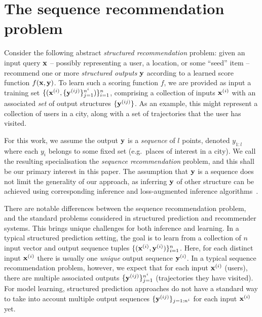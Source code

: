 \section{The sequence recommendation problem}
\label{sec:recseq}

Consider the following abstract
\emph{structured recommendation} problem:
given an input query $\mathbf{x}$ -- possibly representing a user, a location, or some ``seed'' item --
recommend one or more \emph{structured outputs} $\mathbf{y}$ according to a learned score function $f(\mathbf{x},\mathbf{y})$. 
To learn such a scoring function $f$,
we are provided as input a training set
$\{ ( \mathbf{x}^{({i})}, \{ \mathbf{y}^{({ij})} \}_{j=1}^{n^i} ) \}_{i=1}^{n}$,
comprising a collection of inputs $\mathbf{x}^{({i})}$ with an associated \emph{set} of output structures $\{ \mathbf{y}^{({ij})} \}$.
As an example, this might represent a collection of users in a city, along with a set of trajectories that the user has visited.

For this work, we assume the output $\mathbf{y}$ is a \emph{sequence} of $l$ points, denoted $y_{1:l}$
where each $y_i$ belongs to some fixed set (e.g.\ places of interest in a city).
We call the resulting specialisation the \emph{sequence recommendation} problem,
and this shall be our primary interest in this paper.
The assumption that $\mathbf{y}$ is a sequence does not limit the generality of our approach, 
as inferring $\mathbf{y}$ of other structure can be achieved using corresponding inference and loss-augmented inference algorithms~\cite{joachims2009predicting}.  %

There are notable differences between the sequence recommendation problem, and %
the standard problems considered in structured prediction and recommender systems. 
This brings unique challenges for both inference and learning. 
In a typical structured prediction setting, the goal is to learn from a collection of $n$
input vector and output sequence tuples %
$\{ (\mathbf{x}^{({i})}, \mathbf{y}^{({i})}) \}_{i = 1}^n$. Here, 
for each distinct input $\mathbf{x}^{({i})}$ there is usually one \emph{unique} output sequence $\mathbf{y}^{({i})}$. 
In a typical sequence recommendation problem, however, we expect that %
for each input $\mathbf{x}^{({i})}$ (\eg users),
there %
are multiple associated outputs %
$\{ \mathbf{y}^{({ij})} \}_{j=1}^{n^i}$ (\eg trajectories they have visited).
For model learning, structured prediction approaches do not have a standard way to take into account multiple output sequences $\{ \mathbf{y}^{({ij})} \}_{j=1:n^i}$ for each input $\mathbf{x}^{({i})}$ yet. 

